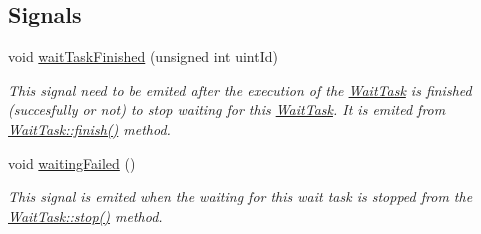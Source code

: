 \subsection*{Signals}
\begin{DoxyCompactItemize}
\item 
\hypertarget{class_wait_task_ae52cf854c36339a1cad9c643e6259978}{}void \hyperlink{class_wait_task_ae52cf854c36339a1cad9c643e6259978}{wait\+Task\+Finished} (unsigned int uint\+Id)\label{class_wait_task_ae52cf854c36339a1cad9c643e6259978}

\begin{DoxyCompactList}\small\item\em This signal need to be emited after the execution of the \hyperlink{class_wait_task}{Wait\+Task} is finished (succesfully or not) to stop waiting for this \hyperlink{class_wait_task}{Wait\+Task}. It is emited from \hyperlink{class_wait_task_a5f3a89b190e0ef7443cc3b9cc8857e9a}{Wait\+Task\+::finish()} method. \end{DoxyCompactList}\item 
\hypertarget{class_wait_task_a224392dd1ee8414b1bdb54619c45f001}{}void \hyperlink{class_wait_task_a224392dd1ee8414b1bdb54619c45f001}{waiting\+Failed} ()\label{class_wait_task_a224392dd1ee8414b1bdb54619c45f001}

\begin{DoxyCompactList}\small\item\em This signal is emited when the waiting for this wait task is stopped from the \hyperlink{class_wait_task_a6bbc82bd62e9fc2cad789a24a6ab928a}{Wait\+Task\+::stop()} method. \end{DoxyCompactList}\end{DoxyCompactItemize}
